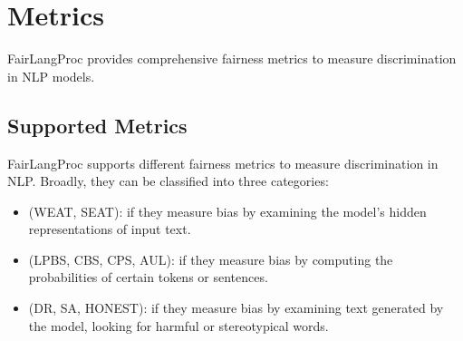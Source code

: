 \documentclass[letterpaper,10pt,english]{sphinxmanual}
\begin{document}
\sphinxstepscope


\chapter{Metrics}
\label{\detokenize{metrics:metrics}}\label{\detokenize{metrics::doc}}
\sphinxAtStartPar
FairLangProc provides comprehensive fairness metrics to measure discrimination in NLP models.


\section{Supported Metrics}
\label{\detokenize{metrics:supported-metrics}}
\sphinxAtStartPar
FairLangProc supports different fairness metrics to measure discrimination in NLP. Broadly, they can be classified into three categories:
\begin{itemize}
\item {} 
\sphinxAtStartPar
{} (WEAT, SEAT): if they measure bias by examining the model’s hidden representations of input text.

\item {} 
\sphinxAtStartPar
{} (LPBS, CBS, CPS, AUL): if they measure bias by computing the probabilities of certain tokens or sentences.

\item {} 
\sphinxAtStartPar
{} (DR, SA, HONEST): if they measure bias by examining text generated by the model, looking for harmful or stereotypical words.

\end{itemize}
\end{document}
